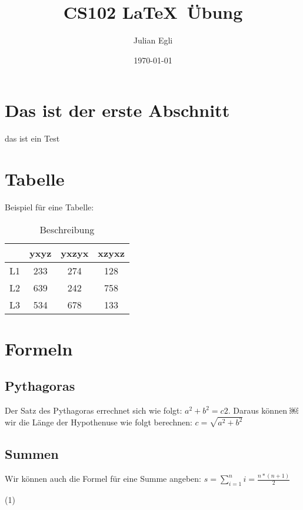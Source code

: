 \documentclass{article}
\date{\today}
\author{Julian Egli}
\title{CS102 \LaTeX  \ \"Ubung}
\begin{document}
\maketitle

\section{Das ist der erste Abschnitt}
das ist ein Test

\section{Tabelle}
Beispiel f\"ur eine Tabelle:
\begin{table}[h]
\centering
\begin{tabular}{c|c|c|c}
 & yxyz & yxzyx & xzyxz \\
\hline L1  & 233 & 274 & 128 \\
L2 & 639 & 242 & 758 \\
L3 & 534 & 678 & 133 \\
\end{tabular}
\caption{Beschreibung}
\end{table}

\section{Formeln}
\subsection{Pythagoras}
Der Satz des Pythagoras errechnet sich wie folgt: $a^2 + b^2 = c2$. Daraus k\"onnen
￼wir die L\"ange der Hypothenuse wie folgt berechnen: $c = \sqrt{a^2 + b^2}$
\subsection{Summen}
Wir k\"onnen auch die Formel f\"ur eine Summe angeben:
\newline
\center $s = \sum\limits_{i=1}^{n}i = \frac{n * (n + 1)}{2}$\begin{flushright} (1) \end{flushright}
\end{document}
